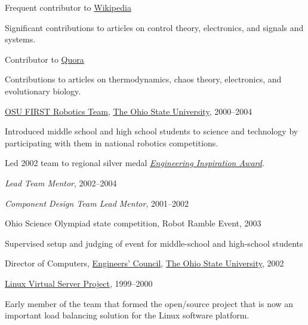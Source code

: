 \documentclass[10pt]{article}
\newcommand{\halfblankline}{\quad\vspace{-0.5\baselineskip}\pagebreak[3]}
\begin{document}
\halfblankline

Frequent contributor to \href{http://www.wikipedia.org/}{Wikipedia}
%
\begin{innerlist}
    \item Significant contributions to articles on control theory,
        electronics, and signals and systems.
\end{innerlist}

\halfblankline

Contributor to \href{http://www.quora.com/}{Quora}
%
\begin{innerlist}
    \item Contributions to articles on thermodynamics, chaos theory,
        electronics, and evolutionary biology.
\end{innerlist}

\halfblankline

\href{http://www.osufirst.org/}{OSU FIRST Robotics Team},
\href{http://www.osu.edu}{The Ohio State University}, 2000--2004
\begin{innerlist}
\item Introduced middle school and high school students to science and
        technology by participating with them in national robotics
        competitions.
\item Led 2002 team to regional silver medal
        \href{http://www.firstwiki.org/Engineering_Inspiration_Award}
             {\emph{Engineering Inspiration Award}}.
\item \emph{Lead Team Mentor}, 2002--2004
\item \emph{Component Design Team Lead Mentor}, 2001--2002
\end{innerlist}

\halfblankline

Ohio Science Olympiad state competition, Robot Ramble Event, 2003
%
\begin{innerlist}
    \item Supervised setup and judging of event for middle-school and
        high-school students
\end{innerlist}

\halfblankline

Director of Computers,
\href{http://ec.osu.edu/}{Engineers' Council},
\href{http://www.osu.edu/}{The Ohio State University}, 2002

\halfblankline

\href{http://www.linuxvirtualserver.org/}
     {Linux Virtual Server Project}, 1999--2000
\begin{innerlist}
\item Early member of the team that formed the open\-/source project that
        is now an important load balancing solution for the Linux
        software platform.
\end{innerlist}
\end{document}
